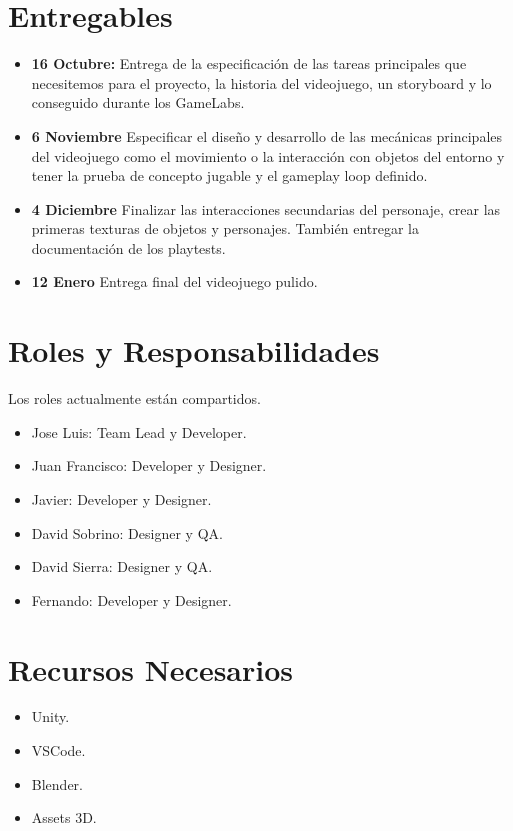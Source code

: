 \documentclass[12pt,twoside,letterpaper]{article}
\begin{document}
\section{Entregables}
\begin{itemize}
    \item \textbf{16 Octubre:}
    Entrega de la especificación de las tareas principales que necesitemos para el proyecto, la historia del videojuego, un storyboard y lo conseguido durante los GameLabs. 

    \item \textbf{6 Noviembre }
    Especificar el diseño y desarrollo de las mecánicas principales del videojuego como el movimiento o la interacción con objetos del entorno y tener la prueba de concepto jugable y el gameplay loop definido. 

    \item \textbf{4 Diciembre }
    Finalizar las interacciones secundarias del personaje, crear las primeras texturas de objetos y personajes. También entregar la documentación de los playtests. 

    \item \textbf{12 Enero}
    Entrega final del videojuego pulido.
\end{itemize}

\section{Roles y Responsabilidades}
Los roles actualmente están compartidos.
\begin{itemize}
    \item Jose Luis: Team Lead y Developer.
    \item Juan Francisco: Developer y Designer.
    \item Javier: Developer y Designer.
    \item David Sobrino: Designer y QA.
    \item David Sierra: Designer y QA.
    \item Fernando: Developer y Designer.
\end{itemize}

\section{Recursos Necesarios}
\begin{itemize}
    \item Unity.
    \item VSCode.
    \item Blender.
    \item Assets 3D.
\end{itemize}
\end{document}
